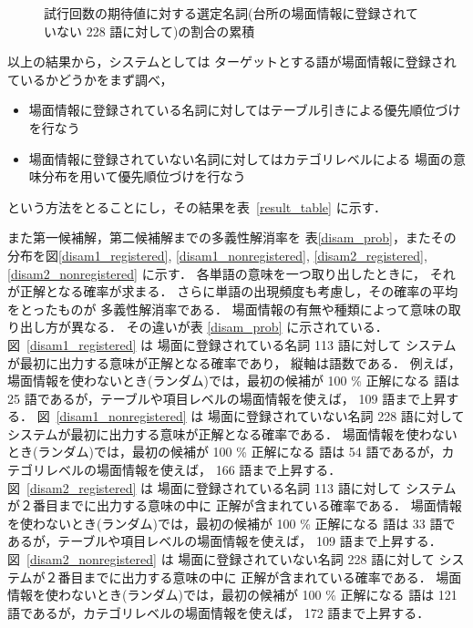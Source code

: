 \begin{figure}
  \begin{center}
  \end{center}
  \caption{試行回数の期待値に対する選定名詞(台所の場面情報に登録されていない 228 語に対して)の割合の累積}
  \label{nonregistered}
\end{figure}

以上の結果から，システムとしては
ターゲットとする語が場面情報に登録されているかどうかをまず調べ，
\begin{itemize}
  \item 場面情報に登録されている名詞に対してはテーブル引きによる優先順位づけを行なう
  \item 場面情報に登録されていない名詞に対してはカテゴリレベルによる
        場面の意味分布を用いて優先順位づけを行なう
\end{itemize}
という方法をとることにし，その結果を表~\ref{result_table} に示す．

また第一候補解，第二候補解までの多義性解消率を
表\ref{disam_prob}，またその分布を図\ref{disam1_registered},
\ref{disam1_nonregistered}, \ref{disam2_registered}, \ref{disam2_nonregistered}
に示す．
各単語の意味を一つ取り出したときに，
それが正解となる確率が求まる．
さらに単語の出現頻度も考慮し，その確率の平均をとったものが
多義性解消率である．
場面情報の有無や種類によって意味の取り出し方が異なる．
その違いが表 \ref{disam_prob} に示されている．
図~\ref{disam1_registered} は
場面に登録されている名詞 113 語に対して
システムが最初に出力する意味が正解となる確率であり，
縦軸は語数である．
例えば，場面情報を使わないとき(ランダム)では，最初の候補が 100 \% 正解になる
語は 25 語であるが，テーブルや項目レベルの場面情報を使えば， 
109 語まで上昇する．
図~\ref{disam1_nonregistered} は
場面に登録されていない名詞 228 語に対して
システムが最初に出力する意味が正解となる確率である．
場面情報を使わないとき(ランダム)では，最初の候補が 100 \% 正解になる
語は 54 語であるが，カテゴリレベルの場面情報を使えば， 
166 語まで上昇する．
図~\ref{disam2_registered} は
場面に登録されている名詞 113 語に対して
システムが２番目までに出力する意味の中に
正解が含まれている確率である．
場面情報を使わないとき(ランダム)では，最初の候補が 100 \% 正解になる
語は 33 語であるが，テーブルや項目レベルの場面情報を使えば， 
109 語まで上昇する．
図~\ref{disam2_nonregistered} は
場面に登録されていない名詞 228 語に対して
システムが２番目までに出力する意味の中に
正解が含まれている確率である．
場面情報を使わないとき(ランダム)では，最初の候補が 100 \% 正解になる
語は 121 語であるが，カテゴリレベルの場面情報を使えば， 
172 語まで上昇する．

